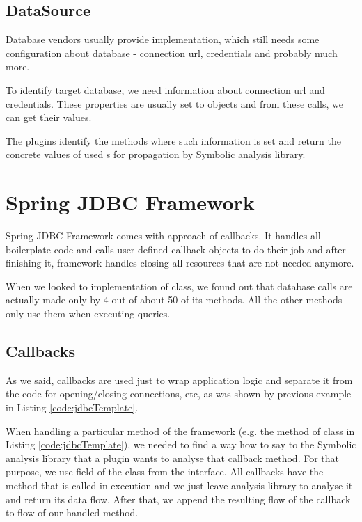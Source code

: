 \subsection{DataSource \label{implementation:dataSource}}

Database vendors usually provide  implementation, which still
needs some configuration about database - connection url, credentials and probably much more.

To identify target database, we need information about connection url and credentials. These properties
are usually set to  objects and from these calls, we can get
their values.

The plugins identify the methods where such information is set and return
the concrete values of used s for propagation by Symbolic analysis library.



\section{Spring JDBC Framework}

Spring JDBC Framework comes with approach of callbacks. It handles
all boilerplate code and calls user defined callback objects to do their job
and after finishing it, framework handles closing all resources that are not needed anymore.

When we looked to implementation of  class, we found out
that database calls are actually made only by 4 out of about 50 of its methods.
All the other methods only use them when executing queries.



\subsection{Callbacks}

As we said, callbacks are used just to wrap application logic and
separate it from the code for opening/closing connections, etc,
as was shown by previous example in Listing \ref{code:jdbcTemplate}.

When handling a particular method of the framework (e.g. the 
method of  class in Listing \ref{code:jdbcTemplate}),
we needed to find a way how to say to the Symbolic analysis library that a plugin wants to
analyse that callback method. For that purpose, we use
field  of the class  from the interface.
All callbacks have the method that is called in execution
and we just leave analysis library to analyse it and return
its data flow. After that, we append the resulting flow of the callback
to flow of our handled method.

